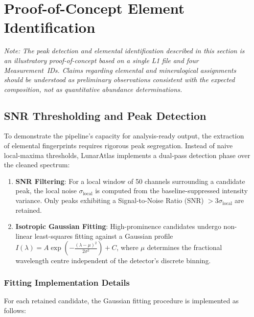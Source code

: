 \documentclass[a4paper,twocolumn,10pt]{article}
\begin{document}
\section{Proof-of-Concept Element Identification}
\label{sec:element_id}

\noindent\textit{Note: The peak detection and elemental identification described in this section is an
illustratory proof-of-concept based on a single L1 file and four Measurement~IDs.
Claims regarding elemental and mineralogical assignments should be understood as
preliminary observations consistent with the expected composition, not as
quantitative abundance determinations.}

\subsection{SNR Thresholding and Peak Detection}

To demonstrate the pipeline's capacity for analysis-ready output, the extraction of elemental fingerprints
requires rigorous peak segregation.  Instead of naive local-maxima thresholds,
LunarAtlas implements a dual-pass detection phase over the cleaned spectrum:

\begin{enumerate}[nosep,leftmargin=*]
  \item \textbf{SNR Filtering}: For a local window of 50 channels surrounding
  a candidate peak, the local noise $\sigma_{\text{local}}$ is computed from
  the baseline-suppressed intensity variance. Only peaks exhibiting a
  Signal-to-Noise Ratio (SNR) $> 3\sigma_{\text{local}}$ are retained.
  \item \textbf{Isotropic Gaussian Fitting}: High-prominence candidates
  undergo non-linear least-squares fitting against a Gaussian profile
  $I(\lambda) = A \exp\left(-\frac{(\lambda - \mu)^2}{2\sigma^2}\right) + C$,
  where $\mu$ determines the fractional wavelength centre independent of the
  detector's discrete binning.
\end{enumerate}

\subsubsection{Fitting Implementation Details}

For each retained candidate, the Gaussian fitting procedure is implemented as follows:
\end{document}
